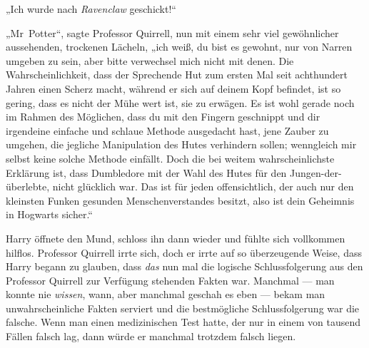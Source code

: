„Ich wurde nach \emph{Ravenclaw} geschickt!“

„Mr~Potter“, sagte Professor Quirrell, nun mit einem sehr viel gewöhnlicher aussehenden, trockenen Lächeln, „ich weiß, du bist es gewohnt, nur von Narren umgeben zu sein, aber bitte verwechsel mich nicht mit denen. Die Wahrscheinlichkeit, dass der Sprechende Hut zum ersten Mal seit achthundert Jahren einen Scherz macht, während er sich auf deinem Kopf befindet, ist so gering, dass es nicht der Mühe wert ist, sie zu erwägen. Es ist wohl gerade noch im Rahmen des Möglichen, dass du mit den Fingern geschnippt und dir irgendeine einfache und schlaue Methode ausgedacht hast, jene Zauber zu umgehen, die jegliche Manipulation des Hutes verhindern sollen; wenngleich mir selbst keine solche Methode einfällt. Doch die bei weitem wahrscheinlichste Erklärung ist, dass Dumbledore mit der Wahl des Hutes für den Jungen-der-überlebte, nicht glücklich war. Das ist für jeden offensichtlich, der auch nur den kleinsten Funken gesunden Menschenverstandes besitzt, also ist dein Geheimnis in Hogwarts sicher.“

Harry öffnete den Mund, schloss ihn dann wieder und fühlte sich vollkommen hilflos. Professor Quirrell irrte sich, doch er irrte auf so überzeugende Weise, dass Harry begann zu glauben, dass \emph{das} nun mal die logische Schlussfolgerung aus den Professor Quirrell zur Verfügung stehenden Fakten war. Manchmal — man konnte nie \emph{wissen}, wann, aber manchmal geschah es eben — bekam man unwahrscheinliche Fakten serviert und die bestmögliche Schlussfolgerung war die falsche. Wenn man einen medizinischen Test hatte, der nur in einem von tausend Fällen falsch lag, dann würde er manchmal trotzdem falsch liegen.

